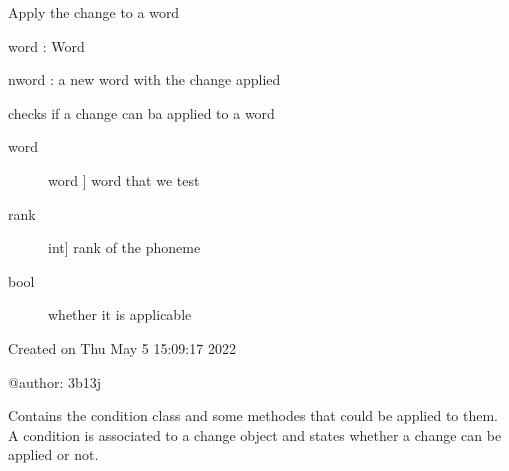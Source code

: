 \documentclass[letterpaper,10pt,english]{sphinxmanual}
\begin{document}
\begin{fulllineitems}
\begin{fulllineitems}
\label{\detokenize{index:Change.S_change.apply_word}}
\sphinxAtStartPar
Apply the change to a word

\sphinxAtStartPar
word : Word

\sphinxAtStartPar
nword : a new word with the change applied

\end{fulllineitems}


\begin{fulllineitems}
\label{\detokenize{index:Change.S_change.check}}
\sphinxAtStartPar
checks if a change can ba applied to a word
\begin{description}
\item[{word}] \leavevmode{[}word {]}
\sphinxAtStartPar
word that we test

\item[{rank}] \leavevmode{[}int{]}
\sphinxAtStartPar
rank of the phoneme

\end{description}
\begin{description}
\item[{bool}] \leavevmode
\sphinxAtStartPar
whether it is applicable

\end{description}

\end{fulllineitems}


\end{fulllineitems}

\label{\detokenize{index:module-Condition}}
\sphinxAtStartPar
Created on Thu May  5 15:09:17 2022

\sphinxAtStartPar
@author: 3b13j

\sphinxAtStartPar
Contains the condition class and some methodes that could be applied to them.
A condition is associated to a change object and states whether a change can be applied or not.
\end{document}

